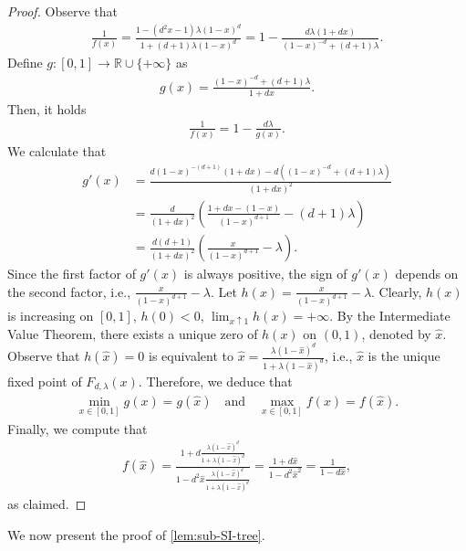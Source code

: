 \documentclass[11pt]{article}
\theoremstyle{plain}
\theoremstyle{definition}
\theoremstyle{remark}
\newcommand{\R}{\mathbb{R}}
\newcommand{\tuple}[1]{\left(#1\right)}
\newcommand{\tp}{\tuple}
\begin{document}
\begin{proof}
Observe that
\begin{align*}
    \frac{1}{f(x)}
    =\frac{1-(d^2x-1)\lambda(1-x)^d}{1+(d+1)\lambda(1-x)^d}
    =1-\frac{d\lambda(1+dx)}{(1-x)^{-d}+(d+1)\lambda}.
\end{align*}
Define $g:[0,1] \to \R\cup\{+\infty\}$ as  
\begin{align*}
    g(x)=\frac{(1-x)^{-d}+(d+1)\lambda}{1+dx}.
\end{align*}
Then, it holds
\begin{align*}
    \frac{1}{f(x)}=1-\frac{d\lambda}{g(x)}.
\end{align*}
We calculate that
\begin{align*}
    g'(x)&=\frac{d(1-x)^{-(d+1)}(1+dx)-d((1-x)^{-d}+(d+1)\lambda)}{(1+dx)^2}\\
    &=\frac{d}{(1+dx)^2}\tp{\frac{1+dx-(1-x)}{(1-x)^{d+1}}-(d+1)\lambda}\\
    &=\frac{d(d+1)}{(1+dx)^2}\tp{\frac{x}{(1-x)^{d+1}}-\lambda}.
\end{align*}
Since the first factor of $g'(x)$ is always positive, the sign of $g'(x)$ depends on the second factor, i.e., $\frac{x}{(1-x)^{d+1}}-\lambda$.
Let $h(x)=\frac{x}{(1-x)^{d+1}}-\lambda$.
Clearly, $h(x)$ is increasing on $[0,1]$, $h(0)<0$, $\lim_{x\uparrow1} h(x)=+\infty$. 
By the Intermediate Value Theorem, there exists a unique zero of $h(x)$ on $(0,1)$, denoted by $\hat x$.
Observe that $h(\hat x)=0$ is equivalent to $\hat x = \frac{\lambda (1-\hat x)^d}{1+\lambda (1-\hat x)^d}$, i.e., $\hat x$ is the unique fixed point of $F_{d,\lambda}(x)$. 
Therefore, we deduce that 
\begin{align*}
    \min_{x\in[0,1]} g(x) = g(\hat x)
    \quad\text{and}\quad
    \max_{x\in[0,1]} f(x) = f(\hat x).
\end{align*}
Finally, we compute that
\begin{align*}
    f(\hat x) = \frac{1+ d \frac{\lambda (1-\hat x)^d}{1+\lambda (1-\hat x)^d}}{1-d^2\hat x\frac{\lambda (1-\hat x)^d}{1+\lambda (1-\hat x)^d}}= \frac{1+d\hat x}{1-d^2\hat x^2} = \frac{1}{1-d\hat x},
\end{align*}
as claimed.
\end{proof}

We now present the proof of \cref{lem:sub-SI-tree}. 
\end{document}
